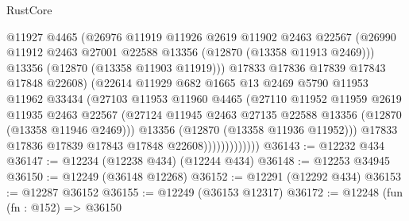 \begin{lexlean}{RustCore}
\begin{coremodule}
                            @11927
                            @4465
                            (@26976
                              @11919
                              @11926
                              @2619
                              @11902
                              @2463
                              @22567
                              (@26990
                                @11912
                                @2463
                                @27001
                                @22588
                                @13356
                                (@12870 (@13358 @11913 @2469)))
                              @13356
                              (@12870 (@13358 @11903 @11919)))
                            @17833
                            @17836
                            @17839
                            @17843
                            @17848
                            @22608)
                          (@22614
                            @11929
                            @682
                            @1665
                            @13
                            @2469
                            @5790
                            @11953
                            @11962
                            @33434
                            (@27103
                              @11953
                              @11960
                              @4465
                              (@27110
                                @11952
                                @11959
                                @2619
                                @11935
                                @2463
                                @22567
                                (@27124
                                  @11945
                                  @2463
                                  @27135
                                  @22588
                                  @13356
                                  (@12870 (@13358 @11946 @2469)))
                                @13356
                                (@12870 (@13358 @11936 @11952)))
                              @17833
                              @17836
                              @17839
                              @17843
                              @17848
                              @22608)))))))))))))
@36143 := @12232 @434
@36147 := @12234 (@12238 @434) (@12244 @434)
@36148 := @12253 @34945
@36150 := @12249 (@36148 @12268)
@36152 := @12291 (@12292 @434)
@36153 := @12287 @36152
@36155 := @12249 (@36153 @12317)
@36172 := @12248
    (fun (fn : @152) =>
    @36150

\end{coremodule}
\end{lexlean}
